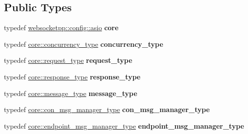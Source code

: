 \subsection*{Public Types}
\begin{DoxyCompactItemize}
\item 
typedef \hyperlink{structwebsocketpp_1_1config_1_1asio}{websocketpp\+::config\+::asio} {\bfseries core}\hypertarget{structtestee__config_a3481397ac125665b93ade70750f08ad0}{}\label{structtestee__config_a3481397ac125665b93ade70750f08ad0}

\item 
typedef \hyperlink{classwebsocketpp_1_1concurrency_1_1basic}{core\+::concurrency\+\_\+type} {\bfseries concurrency\+\_\+type}\hypertarget{structtestee__config_a203634e59fa5b8cd8536c15c2617a2c6}{}\label{structtestee__config_a203634e59fa5b8cd8536c15c2617a2c6}

\item 
typedef \hyperlink{classwebsocketpp_1_1http_1_1parser_1_1request}{core\+::request\+\_\+type} {\bfseries request\+\_\+type}\hypertarget{structtestee__config_a150dbe6906015185777f2e0d70c26585}{}\label{structtestee__config_a150dbe6906015185777f2e0d70c26585}

\item 
typedef \hyperlink{classwebsocketpp_1_1http_1_1parser_1_1response}{core\+::response\+\_\+type} {\bfseries response\+\_\+type}\hypertarget{structtestee__config_a633d1324b3a68ff2a82437ee3c123dff}{}\label{structtestee__config_a633d1324b3a68ff2a82437ee3c123dff}

\item 
typedef \hyperlink{classwebsocketpp_1_1message__buffer_1_1message}{core\+::message\+\_\+type} {\bfseries message\+\_\+type}\hypertarget{structtestee__config_acda8dbb14c22a8774591fbf475211490}{}\label{structtestee__config_acda8dbb14c22a8774591fbf475211490}

\item 
typedef \hyperlink{classwebsocketpp_1_1message__buffer_1_1alloc_1_1con__msg__manager}{core\+::con\+\_\+msg\+\_\+manager\+\_\+type} {\bfseries con\+\_\+msg\+\_\+manager\+\_\+type}\hypertarget{structtestee__config_a33ef92b977927b8aa08c7ec4224e26f2}{}\label{structtestee__config_a33ef92b977927b8aa08c7ec4224e26f2}

\item 
typedef \hyperlink{classwebsocketpp_1_1message__buffer_1_1alloc_1_1endpoint__msg__manager}{core\+::endpoint\+\_\+msg\+\_\+manager\+\_\+type} {\bfseries endpoint\+\_\+msg\+\_\+manager\+\_\+type}\hypertarget{structtestee__config_abf42409cd683ea4a35c91a96ebf7248b}{}\label{structtestee__config_abf42409cd683ea4a35c91a96ebf7248b}


\end{DoxyCompactItemize}
